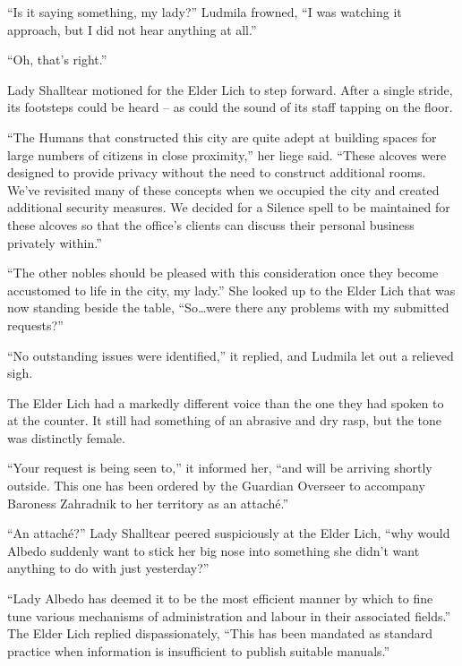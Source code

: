  

“Is it saying something, my lady?” Ludmila frowned, “I was watching it approach, but I did not hear anything at all.”

 

“Oh, that’s right.”

 

Lady Shalltear motioned for the Elder Lich to step forward. After a single stride, its footsteps could be heard – as could the sound of its staff tapping on the floor.

 

“The Humans that constructed this city are quite adept at building spaces for large numbers of citizens in close proximity,” her liege said. “These alcoves were designed to provide privacy without the need to construct additional rooms. We’ve revisited many of these concepts when we occupied the city and created additional security measures. We decided for a Silence spell to be maintained for these alcoves so that the office’s clients can discuss their personal business privately within.”

 

“The other nobles should be pleased with this consideration once they become accustomed to life in the city, my lady.” She looked up to the Elder Lich that was now standing beside the table, “So…were there any problems with my submitted requests?”

 

“No outstanding issues were identified,” it replied, and Ludmila let out a relieved sigh.

 

The Elder Lich had a markedly different voice than the one they had spoken to at the counter. It still had something of an abrasive and dry rasp, but the tone was distinctly female.

 

“Your request is being seen to,” it informed her, “and will be arriving shortly outside. This one has been ordered by the Guardian Overseer to accompany Baroness Zahradnik to her territory as an attaché.”

 

“An attaché?” Lady Shalltear peered suspiciously at the Elder Lich, “why would Albedo suddenly want to stick her big nose into something she didn’t want anything to do with just yesterday?”

 

“Lady Albedo has deemed it to be the most efficient manner by which to fine tune various mechanisms of administration and labour in their associated fields.” The Elder Lich replied dispassionately, “This has been mandated as standard practice when information is insufficient to publish suitable manuals.”

